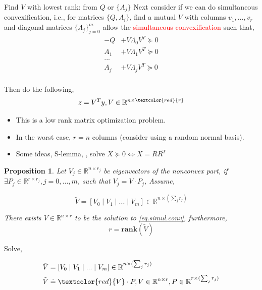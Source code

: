 \documentclass[aspectratio=1610, 9pt]{beamer}
\newcommand{\rank}{\mathbf{rank}}
\newcommand{\red}[1]{\textcolor{red}{#1}}
\newcommand{\real}{\mathbb{R}}
\newtheorem{proposition}{Proposition}
\begin{document}
\begin{frame}[allowframebreaks]{Find \(V\) with lowest rank: from \(Q\) or \(\{A_j\}\)}
  Next consider if we can do simultaneous convexification, i.e., for matrices \(\{Q, A_i\}\), find a mutual \(V\) with columns \(v_1, \dots, v_r\) and diagonal matrices \(\{\Lambda_j\}_{j=0}^m\) allow the \red{simultaneous convexification} such that,
  \begin{equation}\label{eq.simul.conv}
    \begin{aligned}
      - Q & +  V\Lambda_0 V^T \succeq 0 \\
      A_1 & +  V\Lambda_1 V^T \succeq 0 \\
      ...                               \\
      A_j & +  V\Lambda_j V^T \succeq 0 \\
    \end{aligned}
  \end{equation}

  Then do the following,
  \begin{align*}
    z = V^T y , V\in \real^{n \times \red{r}}
  \end{align*}

  \begin{itemize}
    \item This is a low rank matrix optimization problem.
    \item In the worst case, \(r=n\) columns (consider using a random normal basis).
    \item Some ideas, S-lemma, \cite{burer_nonlinear_2003}, solve \(X\succeq 0 \Leftrightarrow X= RR^T \)
  \end{itemize}

  \framebreak

  \begin{proposition}\label{pp.simul.conv.cond1}
    Let \(V_j \in \real^{n\times r_j}\) be eigenvectors of the nonconvex part, if \(\exists P_j \in \real^{r\times r_j}, j = 0,...,m\), such that \(V_j = V \cdot P_j\), Assume,

    \[\tilde V = \left [V_0 \mid V_1 \mid ... \mid V_m \right ]   \in \real^{n \times (\sum_j r_j)}\]

    There exists \(V \in \real^{n\times r}\) to be the solution to \eqref{eq.simul.conv}, furthermore,
    \[ r= \rank (\tilde{V})\]
  \end{proposition}

  Solve,

  \begin{equation}\label{eq.simul.conv1}
    \begin{aligned}
      \tilde V & = \left [V_0 \mid V_1 \mid ... \mid V_m \right ]   \in \real^{n \times (\sum_j r_j)} \\
      \tilde V & \doteq \red{V} \cdot P, V\in \real^{n\times r}, P\in \real^{r\times (\sum_j r_j)}
    \end{aligned}
  \end{equation}




\end{frame}
\end{document}
